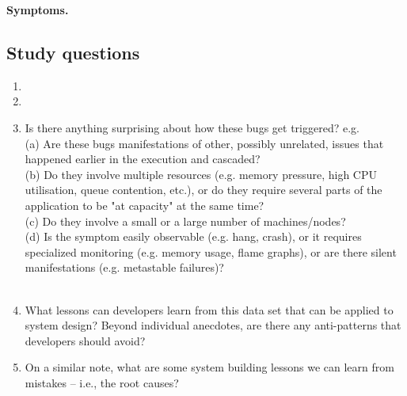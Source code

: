 \vspace{.05in}
\noindent
\textbf{Symptoms.}


\subsection{Study questions}

\begin{enumerate}
    \item {}
    \item {}
    \item Is there anything surprising about how these bugs get triggered? e.g. 
    \\ (a) Are these bugs manifestations of other, possibly unrelated, issues that 
    happened earlier in the execution and cascaded? 
    \\ (b) Do they involve multiple resources (e.g. memory pressure, high CPU utilisation, queue contention, etc.), 
    or do they require several parts of the application to be "at capacity" at the same time? 
    \\ (c) Do they involve a small or a large number of machines/nodes? 
    \\ (d) Is the symptom easily observable (e.g. hang, crash), or it requires specialized monitoring 
  (e.g. memory usage, flame graphs), or are there silent manifestations (e.g. metastable failures)?  
    \\ 
    \\  
    \item What lessons can developers learn from this data set that can be applied to system design? Beyond
    individual anecdotes, are there any anti-patterns that developers should avoid?
    \item On a similar note, what are some system building lessons we can learn from mistakes -- i.e., the root causes?
    \\ 
\end{enumerate}
